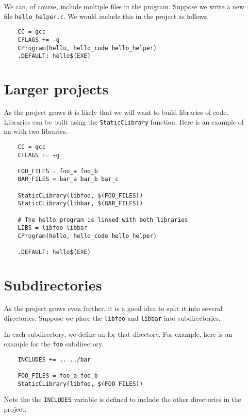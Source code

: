 We can, of course, include multiple files in the program.  Suppose we write a new
file \verb+hello_helper.c+.  We would include this in the project as follows.

\begin{verbatim}
    CC = gcc
    CFLAGS += -g
    CProgram(hello, hello_code hello_helper)
    .DEFAULT: hello$(EXE)
\end{verbatim}

\section{Larger projects}

As the project grows it is likely that we will want to build libraries of code.
Libraries can be built using the \verb+StaticCLibrary+ function.  Here is an example
of an  with two libraries.

\begin{verbatim}
    CC = gcc
    CFLAGS += -g

    FOO_FILES = foo_a foo_b
    BAR_FILES = bar_a bar_b bar_c

    StaticCLibrary(libfoo, $(FOO_FILES))
    StaticCLibrary(libbar, $(BAR_FILES))

    # The hello program is linked with both libraries
    LIBS = libfoo libbar
    CProgram(hello, hello_code hello_helper)

    .DEFAULT: hello$(EXE)
\end{verbatim}

\section{Subdirectories}

As the project grows even further, it is a good idea to split it into several directories.
Suppose we place the \verb+libfoo+ and \verb+libbar+ into subdirectories.

In each subdirectory, we define an  for that directory.  For example, here
is an example  for the \verb+foo+ subdirectory.

\begin{verbatim}
    INCLUDES += .. ../bar

    FOO_FILES = foo_a foo_b
    StaticCLibrary(libfoo, $(FOO_FILES))
\end{verbatim}

Note the the \verb+INCLUDES+ variable is defined to include the other directories in the project.

